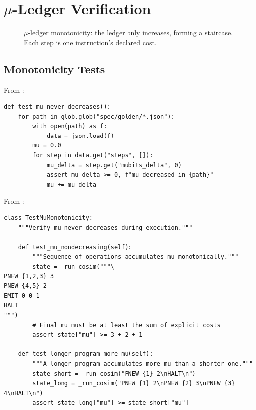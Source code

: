 \section{$\mu$-Ledger Verification}

\begin{figure}[h]
\centering
{}
\caption{$\mu$-ledger monotonicity: the ledger only increases, forming a staircase. Each step is one instruction's declared cost.}
\label{fig:mu-monotonicity}
\end{figure}
\subsection{Monotonicity Tests}

From :
\begin{lstlisting}
def test_mu_never_decreases():
    for path in glob.glob("spec/golden/*.json"):
        with open(path) as f:
            data = json.load(f)
        mu = 0.0
        for step in data.get("steps", []):
            mu_delta = step.get("mubits_delta", 0)
            assert mu_delta >= 0, f"mu decreased in {path}"
            mu += mu_delta
\end{lstlisting}

From :
\begin{lstlisting}
class TestMuMonotonicity:
    """Verify mu never decreases during execution."""

    def test_mu_nondecreasing(self):
        """Sequence of operations accumulates mu monotonically."""
        state = _run_cosim("""\
PNEW {1,2,3} 3
PNEW {4,5} 2
EMIT 0 0 1
HALT
""")
        # Final mu must be at least the sum of explicit costs
        assert state["mu"] >= 3 + 2 + 1

    def test_longer_program_more_mu(self):
        """A longer program accumulates more mu than a shorter one."""
        state_short = _run_cosim("PNEW {1} 2\nHALT\n")
        state_long = _run_cosim("PNEW {1} 2\nPNEW {2} 3\nPNEW {3} 4\nHALT\n")
        assert state_long["mu"] >= state_short["mu"]
\end{lstlisting}

